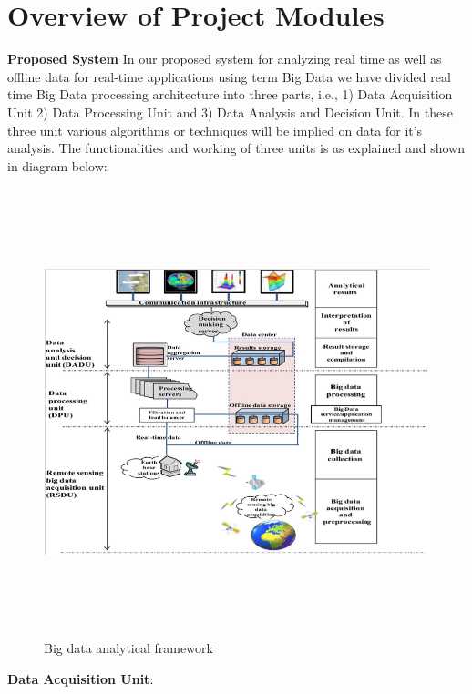 \documentclass[oneside,a4paper,12pt]{book}
\begin{document}
\section{Overview of Project Modules}
\textbf{Proposed System}
In our proposed system for analyzing real time as well as offline data for real-time applications using term Big Data we have divided real time Big Data processing architecture into three parts, i.e., 1) Data Acquisition Unit 2) Data Processing Unit and 3) Data Analysis and Decision Unit. In these three unit various algorithms or techniques will be implied on data for it’s analysis. The functionalities and working of three units is as explained and shown in diagram below:
\begin{figure}[h!]
  \centering
  \includegraphics[width=15cm,
  height=13cm]{bdaf.png}
  \caption{Big data analytical framework}
\end{figure}
\textbf{Data  Acquisition Unit}:
\end{document}
